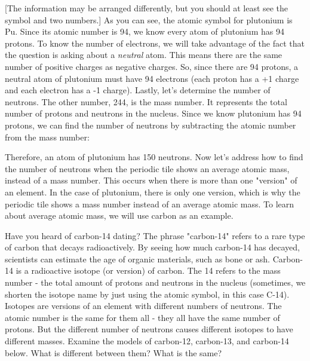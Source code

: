 [The information may be arranged differently, but you should at least see the
symbol and two numbers.] As you can see, the atomic symbol for plutonium is Pu.
Since its atomic number is 94, we know every atom of plutonium has 94 protons.
To know the number of electrons, we will take advantage of the fact that the
question is asking about a \textit{neutral} atom. This means there are the same
number of positive charges as negative charges. So, since there are 94 protons,
a neutral atom of plutonium must have 94 electrons (each proton has a +1 charge
and each electron has a -1 charge). Lastly, let's determine the number of
neutrons. The other number, 244, is the mass number. It represents the total
number of protons and neutrons in the nucleus. Since we know plutonium has 94
protons, we can find the number of neutrons by subtracting the atomic number
from the mass number:

\begin{center}
\end{center}

Therefore, an atom of plutonium has 150 neutrons. Now let's address how to find
the number of neutrons when the periodic tile shows an average atomic mass,
instead of a mass number. This occurs when there is more than one "version" of
an element. In the case of plutonium, there is only one version, which is why
the periodic tile shows a mass number instead of an average atomic mass. To
learn about average atomic mass, we will use carbon as an example.

Have you heard of carbon-14 dating? The phrase "carbon-14" refers to a rare
type of carbon that decays radioactively. By seeing how much carbon-14 has
decayed, scientists can estimate the age of organic materials, such as bone or
ash. Carbon-14 is a radioactive isotope (or version) of carbon. The 14 refers to
the mass number - the total amount of protons and neutrons in the nucleus
(sometimes, we shorten the isotope name by just using the atomic symbol, in
this case C-14). Isotopes are versions of an element with different numbers of
neutrons. The atomic number is the same for them all - they all have the same
number of protons. But the different number of neutrons causes different
isotopes to have different masses. Examine the models of carbon-12, carbon-13,
and carbon-14 below. What is different between them? What is the same?

